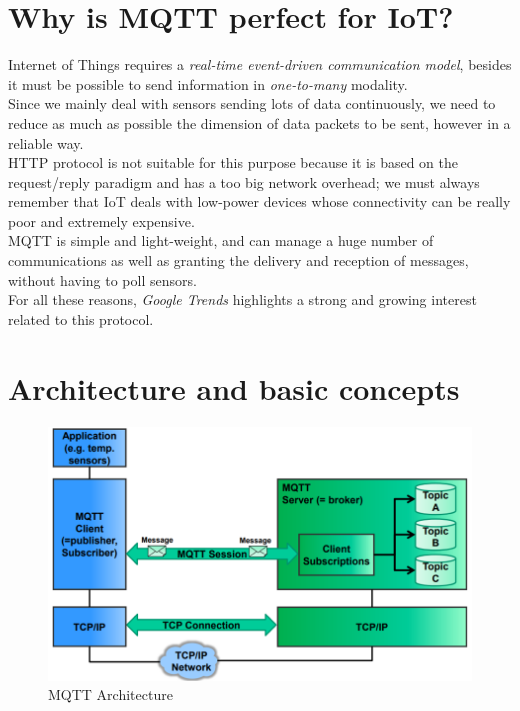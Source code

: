 \documentclass[12pt]{report}
\begin{document}
{%

\section{Why is MQTT perfect for IoT?}
\bigskip
Internet of Things requires a \emph{real-time event-driven communication model}, besides it must be possible to send information in \emph{one-to-many} modality.\\
Since we mainly deal with sensors sending lots of data continuously, we need to reduce as much as possible the dimension of data packets to be sent, however in a reliable way.\\

HTTP protocol is not suitable for this purpose because it is based on the request/reply paradigm and has a too big network overhead; we must always remember that IoT deals with low-power devices whose connectivity can be really poor and extremely expensive.\\

MQTT is simple and light-weight, and can manage a huge number of communications as well as granting the delivery and reception of messages, without having to poll sensors.\\

For all these reasons, \emph{Google Trends} highlights a strong and growing interest related to this protocol.


\section{Architecture and basic concepts}
\begin{figure}[H]
\includegraphics{mqtt_architecture}
\caption{MQTT Architecture}
\label{fig:mqttArchitecture}
\end{figure}

}
\end{document}
